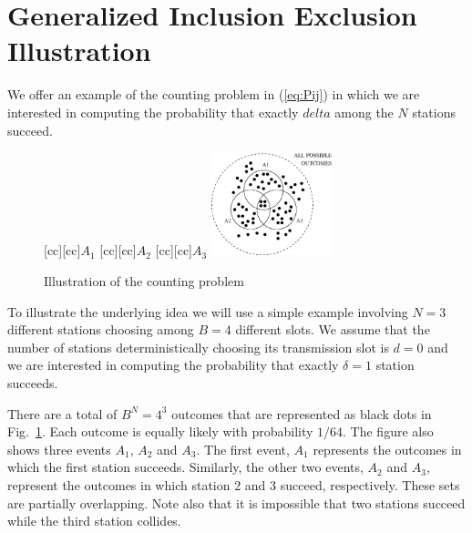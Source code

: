 \documentclass[journal]{IEEEtran}
\begin{document}
%


\appendices
\section{Generalized Inclusion Exclusion Illustration}
\label{app:incl-excl-thm}
\label{app:theorem}
We offer an example of the counting problem in (\ref{eq:Pij})  in which we are interested in computing the probability that exactly $delta$ among the $N$ stations succeed.

\begin{figure}
[cc][cc]{$A_1$}
[cc][cc]{$A_2$}
[cc][cc]{$A_3$}
\centering
\includegraphics[height=3cm]{figures/counting}
\caption{Illustration of the counting problem}
\label{fig:counting}
\end{figure}

To illustrate the underlying idea we will use a simple example involving $N=3$ different stations choosing among $B=4$ different slots.
We assume that the number of stations deterministically choosing its transmission slot is $d=0$ and we are interested in computing the probability that exactly $\delta=1$ station succeeds.

There are a total of $B^N=4^3$ outcomes that are represented as black dots in Fig.~\ref{fig:counting}.
Each outcome is equally likely with probability $1/64$.
The figure also shows three events $A_1$, $A_2$ and $A_3$.
The first event, $A_1$ represents the outcomes in which the first station succeeds.
Similarly, the other two events, $A_2$ and $A_3$, represent the outcomes in which station 2 and 3 succeed, respectively.
These sets are partially overlapping.
Note also that it is impossible that two stations succeed while the third station collides.
\end{document}

